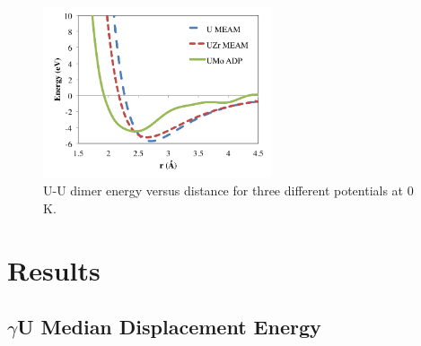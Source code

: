 \documentclass[review]{elsarticle}
\providecommand{\DIFaddtex}[1]{{\protect\color{blue} \sf #1}} %
\providecommand{\DIFaddbegin}{} %
\providecommand{\DIFaddend}{} %
\providecommand{\DIFaddFL}[1]{\DIFadd{#1}} %
\providecommand{\DIFadd}[1]{\texorpdfstring{\DIFaddtex{#1}}{#1}} %
\newcommand{\DIFaddincludegraphics}[2][]{{\color{blue}\fbox{\DIFOincludegraphics[#1]{#2}}}} %
\DeclareRobustCommand{\DIFaddbegin}{\DIFOaddbegin \let\includegraphics\DIFaddincludegraphics} %
\DeclareRobustCommand{\DIFaddend}{\DIFOaddend \let\includegraphics\DIFOincludegraphics} %
\begin{document}
\DIFaddbegin \begin{figure}[h]
 \centering
 \includegraphics[width=0.6\textwidth]{U_U_dimer.png} 
 \caption{\DIFaddFL{U-U dimer energy versus distance for three different potentials at 0 K.}}
 \label{fig:dimer}
\end{figure}

\FloatBarrier

\DIFaddend \section{Results}
\subsection{$\gamma$U Median Displacement Energy}
\end{document}
